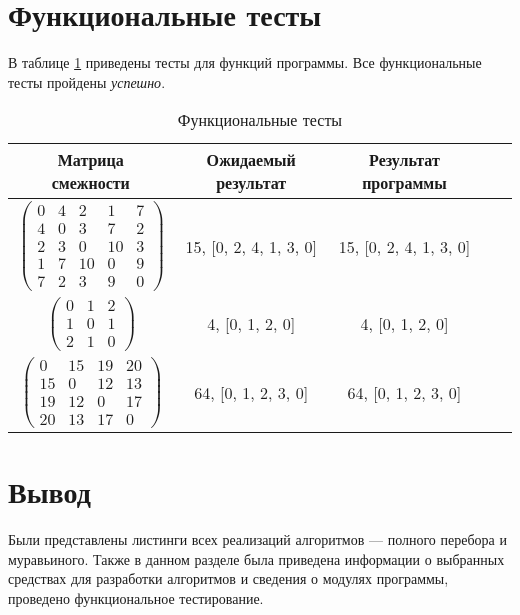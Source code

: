 \section{Функциональные тесты}

В таблице \ref{tbl:functional_test} приведены тесты для функций программы. Все функциональные тесты пройдены \textit{успешно}.

\begin{center}
	\captionsetup{justification=raggedright,singlelinecheck=off}
	\begin{longtable}[c]{|c|c|c|c|c|}
		\caption{Функциональные тесты\label{tbl:functional_test}} \\ \hline
		Матрица смежности & Ожидаемый результат & Результат программы \\
		\hline
		$ \begin{pmatrix}
			0 &  4 &  2 &  1 & 7 \\
			4 &  0 &  3 &  7 & 2 \\
			2 &  3 &  0 & 10 & 3 \\
			1 &  7 & 10 &  0 & 9 \\
			7 &  2 &  3 &  9 & 0
		\end{pmatrix}$ &
		15, [0, 2, 4, 1, 3, 0] &
		15, [0, 2, 4, 1, 3, 0] \\
		
		$ \begin{pmatrix}
			0 & 1 & 2 \\
			1 & 0 & 1 \\
			2 & 1 & 0	
		\end{pmatrix}$ &
		4, [0, 1, 2, 0] &
		4, [0, 1, 2, 0] \\
		
		$ \begin{pmatrix}
			0 & 15 & 19 & 20 \\
			15 &  0 & 12 & 13 \\
			19 & 12 &  0 & 17 \\
			20 & 13 & 17 &  0
		\end{pmatrix}$ &
		64, [0, 1, 2, 3, 0] &
		64, [0, 1, 2, 3, 0] \\
		\hline
	\end{longtable}
\end{center}

\section{Вывод}

Были представлены листинги всех реализаций алгоритмов --- полного перебора и муравьиного. Также в данном разделе была приведена информации о выбранных средствах для разработки алгоритмов и сведения о модулях программы, проведено функциональное тестирование.
